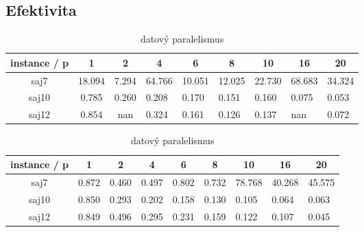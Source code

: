 \documentclass{article}
\begin{document}
    \subsection{Efektivita}

    \begin{table}[h]
        \begin{subtable}{.5\linewidth}\centering
        \begin{tabular}{|c|c|c|l|l|l|l|l|l|}
            \hline
            \textbf{instance / p} &
            \textbf{1} &
            \textbf{2} &
            \multicolumn{1}{c|}{\textbf{4}} &
            \multicolumn{1}{c|}{\textbf{6}} &
            \multicolumn{1}{c|}{\textbf{8}} &
            \multicolumn{1}{c|}{\textbf{10}} &
            \multicolumn{1}{c|}{\textbf{16}} &
            \multicolumn{1}{c|}{\textbf{20}} \\ \hline
            saj7 &
                {\color[HTML]{FE0000} 18.094} &
                {\color[HTML]{FE0000} 7.294} &
                {\color[HTML]{FE0000} 64.766} &
                {\color[HTML]{FE0000} 10.051} &
                {\color[HTML]{FE0000} 12.025} &
                {\color[HTML]{FE0000} 22.730} &
                {\color[HTML]{FE0000} 68.683} &
                {\color[HTML]{FE0000} 34.324} \\ \hline
            saj10 & 0.785 & 0.260 & 0.208 & 0.170 & 0.151 & 0.160 & 0.075 & 0.053 \\ \hline
            saj12 & 0.854 & nan   & 0.324 & 0.161 & 0.126 & 0.137 & nan   & 0.072 \\ \hline
        \end{tabular}
        \caption{taskový paralelismus}
        \label{tab:efektivita-openmp-task}
        \end{subtable}%

        \begin{subtable}{.5\linewidth}\centering
        \begin{tabular}{|c|c|c|l|l|l|l|l|l|}
            \hline
            \textbf{instance / p} &
            \textbf{1} &
            \textbf{2} &
            \multicolumn{1}{c|}{\textbf{4}} &
            \multicolumn{1}{c|}{\textbf{6}} &
            \multicolumn{1}{c|}{\textbf{8}} &
            \multicolumn{1}{c|}{\textbf{10}} &
            \multicolumn{1}{c|}{\textbf{16}} &
            \multicolumn{1}{c|}{\textbf{20}} \\ \hline
            saj7  & 0.872 & 0.460 & 0.497 & 0.802 & 0.732 & {\color[HTML]{FE0000} 78.768} & {\color[HTML]{FE0000} 40.268} & {\color[HTML]{FE0000} 45.575} \\ \hline
            saj10 & 0.850 & 0.293 & 0.202 & 0.158 & 0.130 & 0.105                         & 0.064                         & 0.063                         \\ \hline
            saj12 & 0.849 & 0.496 & 0.295 & 0.231 & 0.159 & 0.122                         & 0.107                         & 0.045                         \\ \hline
        \end{tabular}
        \caption{datový paralelismus}
        \label{tab:efektivita-openmp-data}
        \end{subtable}%


\end{table}
\end{document}

